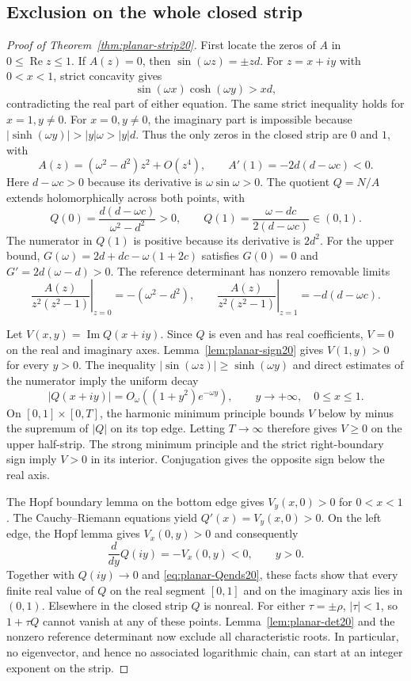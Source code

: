 \documentclass[11pt,a4paper]{article}
\theoremstyle{remark}
\numberwithin{equation}{section}
\begin{document}
\subsection{Exclusion on the whole closed strip}

\begin{proof}[Proof of Theorem~\ref{thm:planar-strip20}]
First locate the zeros of $A$ in $0\le\operatorname{Re}z\le1$.
If $A(z)=0$, then $\sin(\omega z)=\pm zd$. For $z=x+iy$ with
$0<x<1$, strict concavity gives
\[
 \sin(\omega x)\cosh(\omega y)>xd,
\]
contradicting the real part of either equation. The same strict inequality
holds for $x=1,y\ne0$. For $x=0,y\ne0$, the imaginary part is impossible
because $|\sinh(\omega y)|>|y|\omega>|y|d$.
Thus the only zeros in the closed strip are $0$ and $1$, with
\[
 A(z)=(\omega^2-d^2)z^2+O(z^4),\qquad
 A'(1)=-2d(d-\omega c)<0.
\]
Here $d-\omega c>0$ because its derivative is $\omega\sin\omega>0$.
The quotient $Q=N/A$ extends holomorphically across both points, with
\begin{equation}\label{eq:planar-Qends20}
 Q(0)=\frac{d(d-\omega c)}{\omega^2-d^2}>0,
 \qquad
 Q(1)=\frac{\omega-dc}{2(d-\omega c)}\in(0,1).
\end{equation}
The numerator in $Q(1)$ is positive because its derivative is $2d^2$.
For the upper bound, $G(\omega)=2d+dc-\omega(1+2c)$ satisfies
$G(0)=0$ and $G'=2d(\omega-d)>0$.
The reference determinant has nonzero removable limits
\[
 \left.\frac{A(z)}{z^2(z^2-1)}\right|_{z=0}
 =-(\omega^2-d^2),\qquad
 \left.\frac{A(z)}{z^2(z^2-1)}\right|_{z=1}
 =-d(d-\omega c).
\]

Let $V(x,y)=\operatorname{Im}Q(x+iy)$. Since $Q$ is even and has real
coefficients, $V=0$ on the real and imaginary axes.
Lemma~\ref{lem:planar-sign20} gives $V(1,y)>0$ for every $y>0$.
The inequality $|\sin(\omega z)|\ge\sinh(\omega y)$ and direct estimates
of the numerator imply the uniform decay
\[
 |Q(x+iy)|=O_\omega((1+y^2)e^{-\omega y}),
 \qquad y\longrightarrow+\infty,\quad 0\le x\le1.
\]
On $[0,1]\times[0,T]$, the harmonic minimum principle bounds $V$ below
by minus the supremum of $|Q|$ on its top edge. Letting $T\to\infty$
therefore gives $V\ge0$ on the upper half-strip. The strong minimum
principle and the strict right-boundary sign imply $V>0$ in its interior.
Conjugation gives the opposite sign below the real axis.

The Hopf boundary lemma on the bottom edge gives
$V_y(x,0)>0$ for $0<x<1$. The Cauchy--Riemann equations yield
$Q'(x)=V_y(x,0)>0$. On the left edge, the Hopf lemma gives
$V_x(0,y)>0$ and consequently
\[
 \frac{d}{dy}Q(iy)=-V_x(0,y)<0,\qquad y>0.
\]
Together with $Q(iy)\to0$ and \eqref{eq:planar-Qends20}, these facts show
that every finite real value of $Q$ on the real segment $[0,1]$ and on the
imaginary axis lies in $(0,1)$. Elsewhere in the closed strip $Q$ is nonreal.
For either $\tau=\pm\rho$, $|\tau|<1$, so $1+\tau Q$ cannot vanish at
any of these points. Lemma~\ref{lem:planar-det20} and the nonzero reference
determinant now exclude all characteristic roots. In particular, no
eigenvector, and hence no associated logarithmic chain, can start at an
integer exponent on the strip.
\end{proof}
\end{document}
